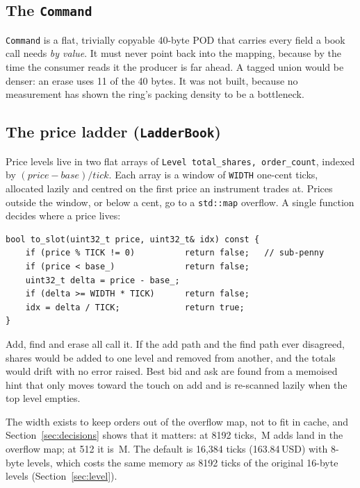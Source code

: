 \documentclass[10pt,a4paper]{article}
\newcommand{\code}[1]{\texttt{#1}}
\begin{document}
\subsection{The \code{Command}}
\code{Command} is a flat, trivially copyable 40-byte POD that carries every field a book call needs \emph{by value}.
It must never point back into the mapping, because by the time the consumer reads it the producer is far ahead.
A tagged union would be denser: an erase uses 11 of the 40 bytes. It was not built, because no measurement has shown the ring's packing density to be a bottleneck.

\subsection{The price ladder (\code{LadderBook})}
Price levels live in two flat arrays of \code{Level total\_shares, order\_count}, indexed by
$(\textit{price}-\textit{base})/\textit{tick}$. Each array is a window of \code{WIDTH} one-cent ticks, allocated lazily
and centred on the first price an instrument trades at. Prices outside the window, or below a cent, go to a \code{std::map} overflow.
A single function decides where a price lives:
\begin{lstlisting}
bool to_slot(uint32_t price, uint32_t& idx) const {
    if (price % TICK != 0)          return false;   // sub-penny
    if (price < base_)              return false;
    uint32_t delta = price - base_;
    if (delta >= WIDTH * TICK)      return false;
    idx = delta / TICK;             return true;
}
\end{lstlisting}
Add, find and erase all call it. If the add path and the find path ever disagreed, shares would be added to one level and
removed from another, and the totals would drift with no error raised. Best bid and ask are found from a memoised hint that only moves
toward the touch on add and is re-scanned lazily when the top level empties.

The width exists to keep orders out of the overflow map, not to fit in cache, and Section~\ref{sec:decisions} shows that it matters:
at 8192 ticks, \DfibOv\,M adds land in the overflow map; at 512 it is \DfibhOv\,M.
The default is 16{,}384 ticks (163.84\,USD) with 8-byte levels, which costs the same memory as 8192 ticks of the original 16-byte levels (Section~\ref{sec:level}).
\end{document}

